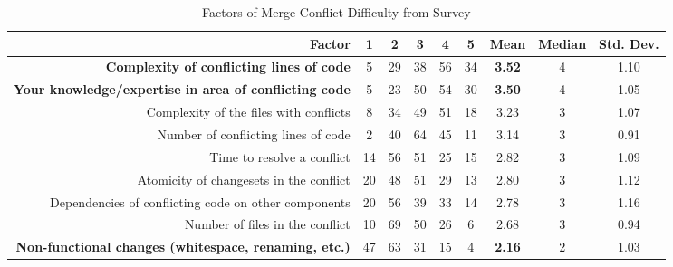 \begin{table*}[!]
\renewcommand{\arraystretch}{1.3}
\caption{Factors of Merge Conflict Difficulty from Survey}
\label{survey_merge_conflicts}
\centering
\begin{tabularx}{0.78\textwidth}{r | *5{c} | *3{c}}

\toprule
	Factor & 1 & 2 & 3 & 4 & 5 & Mean & Median & Std. Dev. \\
\midrule
	\textbf{Complexity of conflicting lines of code} & 5 & 29 & 38 & 56 & 34 & \textbf{3.52} & 4 & 1.10 \\
	\textbf{Your knowledge/expertise in area of conflicting code} & 5 & 23 & 50 & 54 & 30 & \textbf{3.50} & 4 & 1.05 \\
	Complexity of the files with conflicts & 8 & 34 & 49 & 51 & 18 & 3.23 & 3 & 1.07 \\
	Number of conflicting lines of code & 2 & 40 & 64 & 45 & 11 & 3.14 & 3 & 0.91 \\
	Time to resolve a conflict & 14 & 56 & 51 & 25 & 15 & 2.82 & 3 & 1.09 \\
	Atomicity of changesets in the conflict & 20 & 48 & 51 & 29 & 13 & 2.80 & 3 & 1.12 \\
	Dependencies of conflicting code on other components & 20 & 56 & 39 & 33 & 14 & 2.78 & 3 & 1.16 \\
	Number of files in the conflict & 10 & 69 & 50 & 26 & 6 & 2.68 & 3 & 0.94 \\
	\textbf{Non-functional changes (whitespace, renaming, etc.)} & 47 & 63 & 31 & 15 & 4 & \textbf{2.16} & 2 & 1.03 \\
\bottomrule
\end{tabularx}
\end{table*}


